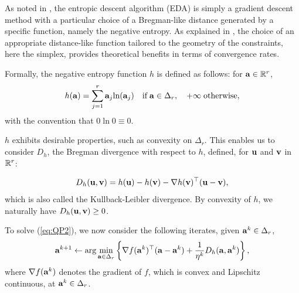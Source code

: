 As noted in \cite{beck_mirror_2003}, the entropic descent algorithm (EDA) is simply a gradient descent method with a particular choice of a Bregman-like distance \cite{bregman_relaxation_1967} generated by a specific function, namely the negative entropy.
As explained in \cite{teboulle_entropic_1992}, the choice of an appropriate distance-like function tailored to the geometry of the constraints, here the simplex, provides theoretical benefits in terms of convergence rates.

Formally, the negative entropy function $h$ is defined as follows: for $\mathbf a \in \mathbb R^r$,
\begin{equation}
    \label{eq:neg_ent}
    h(\mathbf a) = \sum_{j=1}^r \mathbf a_j \text{ln}(\mathbf a_j) \quad \text{if} \; \mathbf a \in \Delta_r, \quad +\infty \; \text{otherwise}, 
\end{equation}
with the convention that $0 \; \text{ln} \; 0 \equiv 0$.

$h$ exhibits desirable properties, such as convexity on $\Delta_r$.
This enables us to consider $D_h$, the Bregman divergence \cite{bregman_relaxation_1967} with respect to $h$, defined, for $\mathbf u$ and $\mathbf v$ in $\mathbb R^r$:

\begin{equation}
    \label{eq:breg_div}
    D_h(\mathbf u, \mathbf v) = h(\mathbf u) - h(\mathbf v) - \nabla h(\mathbf v)^\top (\mathbf u - \mathbf v),
\end{equation}
which is also called the Kullback-Leibler divergence. By convexity of $h$, we naturally have $D_h(\mathbf u, \mathbf v) \geq 0$.

To solve (\ref{eq:QP2}), we now consider the following iterates, given $\mathbf a^k \in \Delta_r$,
\begin{equation}
    \label{eq:update_EDAA}
    \mathbf a^{k+1} \leftarrow \arg \min_{\mathbf a \in \Delta_r} \left\{\nabla f(\mathbf a^k)^\top (\mathbf a - \mathbf a^k) + \frac{1}{\eta^k} D_h(\mathbf a, \mathbf a^k)\right\},
\end{equation}
where $\nabla f(\mathbf a^k)$ denotes the gradient of $f$, which is convex and Lipschitz continuous, at $\mathbf a^k \in \Delta_r$.

